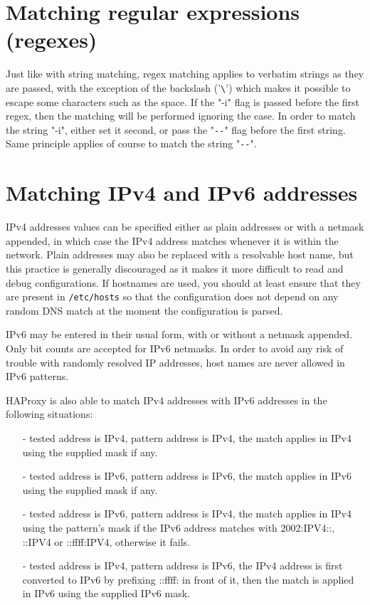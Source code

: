 \section{Matching regular expressions (regexes)}

Just like with string matching, regex matching applies to verbatim strings as
they are passed, with the exception of the backslash ('\verb|\|') which makes it
possible to escape some characters such as the space. If the "-i" flag is
passed before the first regex, then the matching will be performed ignoring
the case. In order to match the string "-i", either set it second, or pass
the "\verb|--|" flag before the first string. Same principle applies of course to
match the string "\verb|--|".

\section{Matching IPv4 and IPv6 addresses}

IPv4 addresses values can be specified either as plain addresses or with a
netmask appended, in which case the IPv4 address matches whenever it is
within the network. Plain addresses may also be replaced with a resolvable
host name, but this practice is generally discouraged as it makes it more
difficult to read and debug configurations. If hostnames are used, you should
at least ensure that they are present in \texttt{/etc/hosts} so that the configuration
does not depend on any random DNS match at the moment the configuration is
parsed.

IPv6 may be entered in their usual form, with or without a netmask appended.
Only bit counts are accepted for IPv6 netmasks. In order to avoid any risk of
trouble with randomly resolved IP addresses, host names are never allowed in
IPv6 patterns.

HAProxy is also able to match IPv4 addresses with IPv6 addresses in the
following situations:
\begin{itemize}
\item[-] tested address is IPv4, pattern address is IPv4, the match applies
    in IPv4 using the supplied mask if any.
\item[-] tested address is IPv6, pattern address is IPv6, the match applies
    in IPv6 using the supplied mask if any.
\item[-] tested address is IPv6, pattern address is IPv4, the match applies in IPv4
    using the pattern's mask if the IPv6 address matches with 2002:IPV4::,
    ::IPV4 or ::ffff:IPV4, otherwise it fails.
\item[-] tested address is IPv4, pattern address is IPv6, the IPv4 address is first
    converted to IPv6 by prefixing ::ffff: in front of it, then the match is
    applied in IPv6 using the supplied IPv6 mask.
\end{itemize}

